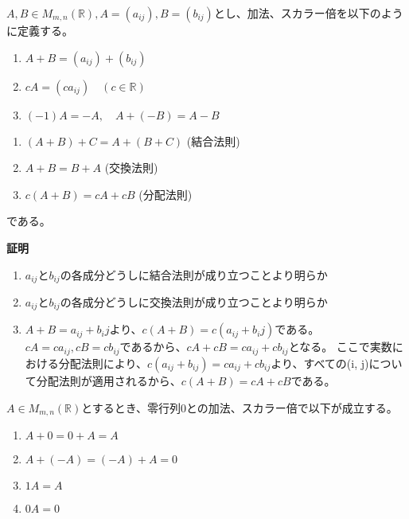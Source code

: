 \documentclass[dvipdfmx,autodetect-engine]{jsarticle}
\begin{document}
\label{defi:additionAndScalarMultiple}

$A, B \in M_{m,n}(\mathbb{R}), A = (a_{ij}), B = (b_{ij})$とし、加法、スカラー倍を以下のように定義する。

\begin{enumerate}
\renewcommand{\labelenumi}{(\arabic{enumi})}
\item $A + B = (a_{ij}) + (b_{ij})$
\item $cA = (ca_{ij}) \quad (c \in \mathbb{R})$
\item $(-1)A = -A, \quad A + (-B) = A - B$
\end{enumerate}


\begin{enumerate}
\renewcommand{\labelenumi}{(\arabic{enumi})}
\item $(A + B) + C = A + (B + C)$ \quad (結合法則)
\item $A + B = B + A$ \quad (交換法則)
\item $c(A+B) = cA + cB$ \quad (分配法則)
\end{enumerate}

である。

{\bf 証明}

\begin{enumerate}
\renewcommand{\labelenumi}{(\arabic{enumi})}
\item $a_{ij}とb_{ij}の各成分どうしに結合法則が成り立つことより明らか$
\item $a_{ij}とb_{ij}の各成分どうしに交換法則が成り立つことより明らか$
\item $A + B = a_{ij} + b_ij$より、$c(A + B) = c(a_{ij} + b_ij)$である。
$cA = ca_{ij}, cB = cb_{ij}$であるから、$cA + cB = ca_{ij} + cb_{ij}$となる。
ここで実数における分配法則により、$c(a_{ij} + b_{ij}) = ca_{ij} + cb_{ij}$より、すべての(i, j)について分配法則が適用されるから、$c(A+B) = cA + cB$である。
\end{enumerate}


$A \in M_{m,n}(\mathbb{R})$とするとき、零行列$0$との加法、スカラー倍で以下が成立する。

\begin{enumerate}
\renewcommand{\labelenumi}{(\arabic{enumi})}
\item $A + 0 = 0 + A = A$
\item $A + (-A) = (-A) + A = 0$
\item $1A = A$
\item $0A = 0$
\end{enumerate}
\end{document}
